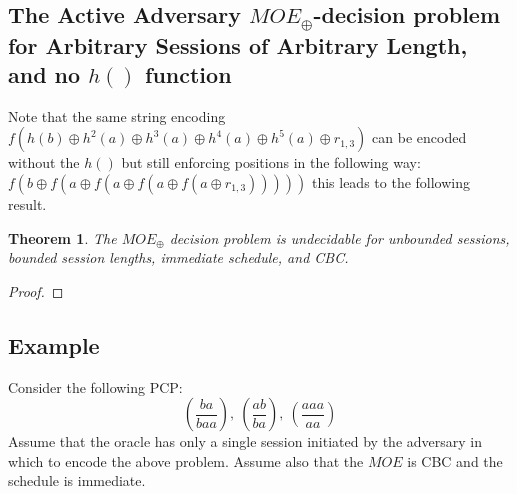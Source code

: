 \documentclass[11pt,twoside,a4paper]{article}
\newtheorem{theorem}{Theorem}
\begin{document}
\subsection{The Active Adversary $MOE_{\oplus}$-decision problem for Arbitrary Sessions of Arbitrary Length, and no $h()$ function}

Note that the same string encoding $f(h(b) \oplus h^2(a) 
\oplus h^3(a) \oplus h^4(a) \oplus h^5(a)
\oplus r_{1,3})$ can be encoded without the $h()$ but still enforcing
positions in the following way: 
$f(b \oplus f(a \oplus f(a \oplus f(a \oplus f(a \oplus r_{1,3})))))$ 
this leads to the following result.

\begin{theorem}\label{thm:bounded_unbounded}
	The $MOE_{\oplus}$ decision problem is undecidable for unbounded 
	sessions, bounded session lengths, immediate schedule, and CBC.	
\end{theorem}
\begin{proof}
\end{proof}
\vfill
\pagebreak
\subsection{Example}
Consider the following PCP:
\[
(\frac{ba}{baa}),~(\frac{ab}{ba}),~(\frac{aaa}{aa})
\] 
Assume that the oracle has only a single session initiated by the 
adversary in which to encode the above problem. Assume also that the
$MOE$ is CBC and the schedule is immediate.  
\end{document}

